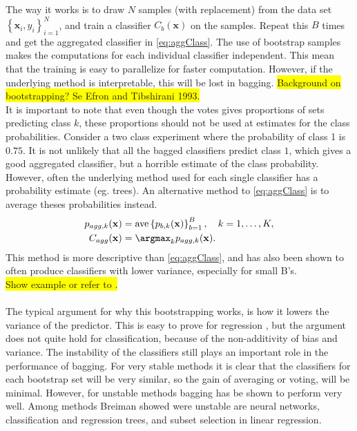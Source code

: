 The way it works is to draw $N$ samples (with replacement) from the data set $\left\{ \mathbf{x}_i, y_i \right\}_{i=1}^{N}$, and train a classifier $C_b(\mathbf{x})$ on the samples. Repeat this $B$ times and get the aggregated classifier in  \eqref{eq:aggClass}. The use of bootstrap samples makes the computations for each individual classifier independent. This mean that the training is easy to parallelize for faster computation. However, if the underlying method is interpretable, this will be lost in bagging.
\colorbox{yellow}{Background on bootstrapping? Se Efron and Tibshirani 1993.} \\
It is important to note that even though the votes gives proportions of sets predicting class $k$, these proportions should not be used at estimates for the class probabilities. Consider a two class experiment where the probability of class 1 is $0.75$. It is not unlikely that all the bagged classifiers predict class $1$, which gives a good aggregated classifier, but a horrible estimate of the class probability. However, often the underlying method used for each single classifier has a probability estimate (eg. trees). An alternative method to \eqref{eq:aggClass} is to average theses probabilities instead.
\begin{align}
  p_{agg, k}(\mathbf{x}) &=  \mathrm{ave}\left\{ p_{b, k}(\mathbf{x}) \right\}_{b = 1}^{B}, \quad k = 1, \ldots, K, \\
  \label{eq:aggClassP} 
  C_{agg}(\mathbf{x}) &= \argmax_k p_{agg, k}(\mathbf{x}).
\end{align}
This method is more descriptive than \eqref{eq:aggClass}, and has also been shown to often produce classifiers with lower variance, especially for small B's.\\
\colorbox{yellow}{Show example or refer to \cite[8.7]{modstat}.}
\\
\\
The typical argument for why this bootstrapping works, is how it lowers the variance of the predictor. This is easy to prove for regression \cite{modstat}, but the argument does not quite hold for classification, because of the non-additivity of bias and variance. The instability of the classifiers still plays an important role in the performance of bagging. For very stable methods it is clear that the classifiers for each bootstrap set will be very similar, so the gain of averaging or voting, will be minimal. However, for unstable methods bagging has be shown to perform very well. Among methods Breiman showed were unstable are neural networks, classification and regression trees, and subset selection in linear regression.

